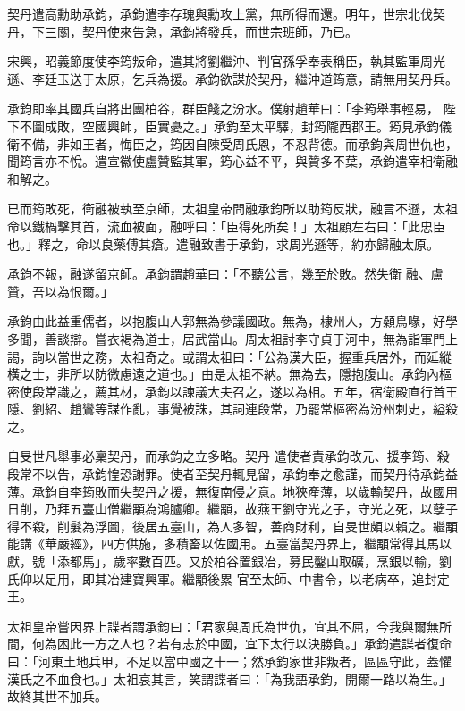 \begin{pinyinscope}
 契丹遣高勳助承鈞，承鈞遣李存瑰與勳攻上黨，無所得而還。明年，世宗北伐契丹，下三關，契丹使來告急，承鈞將發兵，而世宗班師，乃已。



 宋興，昭義節度使李筠叛命，遣其將劉繼沖、判官孫孚奉表稱臣，執其監軍周光遜、李廷玉送于太原，乞兵為援。承鈞欲謀於契丹，繼沖道筠意，請無用契丹兵。



 承鈞即率其國兵自將出團柏谷，群臣餞之汾水。僕射趙華曰：「李筠舉事輕易，
 陛下不圖成敗，空國興師，臣實憂之。」承鈞至太平驛，封筠隴西郡王。筠見承鈞儀衛不備，非如王者，悔臣之，筠因自陳受周氏恩，不忍背德。而承鈞與周世仇也，聞筠言亦不悅。遣宣徽使盧贊監其軍，筠心益不平，與贊多不葉，承鈞遣宰相衛融和解之。



 已而筠敗死，衛融被執至京師，太祖皇帝問融承鈞所以助筠反狀，融言不遜，太祖命以鐵楇擊其首，流血被面，融呼曰：「臣得死所矣！」太祖顧左右曰：「此忠臣也。」釋之，命以良藥傅其瘡。遣融致書于承鈞，求周光遜等，約亦歸融太原。



 承鈞不報，融遂留京師。承鈞謂趙華曰：「不聽公言，幾至於敗。然失衛
 融、盧贊，吾以為恨爾。」



 承鈞由此益重儒者，以抱腹山人郭無為參議國政。無為，棣州人，方顙鳥喙，好學多聞，善談辯。嘗衣褐為道士，居武當山。周太祖討李守貞于河中，無為詣軍門上謁，詢以當世之務，太祖奇之。或謂太祖曰：「公為漢大臣，握重兵居外，而延縱橫之士，非所以防微慮遠之道也。」由是太祖不納。無為去，隱抱腹山。承鈞內樞密使段常識之，薦其材，承鈞以諫議大夫召之，遂以為相。五年，宿衛殿直行首王隱、劉紹、趙鸞等謀作亂，事覺被誅，其詞連段常，乃罷常樞密為汾州刺史，縊殺之。



 自旻世凡舉事必稟契丹，而承鈞之立多略。契丹
 遣使者責承鈞改元、援李筠、殺段常不以告，承鈞惶恐謝罪。使者至契丹輒見留，承鈞奉之愈謹，而契丹待承鈞益薄。承鈞自李筠敗而失契丹之援，無復南侵之意。地狹產薄，以歲輸契丹，故國用日削，乃拜五臺山僧繼顒為鴻臚卿。繼顒，故燕王劉守光之子，守光之死，以孽子得不殺，削髮為浮圖，後居五臺山，為人多智，善商財利，自旻世頗以賴之。繼顒能講《華嚴經》，四方供施，多積畜以佐國用。五臺當契丹界上，繼顒常得其馬以獻，號「添都馬」，歲率數百匹。又於柏谷置銀冶，募民鑿山取礦，烹銀以輸，劉氏仰以足用，即其冶建寶興軍。繼顒後累
 官至太師、中書令，以老病卒，追封定王。



 太祖皇帝嘗因界上諜者謂承鈞曰：「君家與周氏為世仇，宜其不屈，今我與爾無所間，何為困此一方之人也？若有志於中國，宜下太行以決勝負。」承鈞遣諜者復命曰：「河東土地兵甲，不足以當中國之十一；然承鈞家世非叛者，區區守此，蓋懼漢氏之不血食也。」太祖哀其言，笑謂諜者曰：「為我語承鈞，開爾一路以為生。」故終其世不加兵。




\end{pinyinscope}
